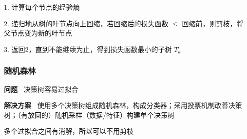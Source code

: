 \documentclass[b4paper, 10pt]{ctexart}
\newcommand*{\setN}{\mathbb{N}}
\newcommand*{\setZ}{\mathbb{Z}}
\newcommand*{\setQ}{\mathbb{Q}}
\newcommand*{\setR}{\mathbb{R}}
\newcommand*{\setC}{\mathbb{C}}
\newcommand*{\powerset}[1]{\mathscr{P}(#1)}
\newcommand*{\impl}{\Rightarrow}
\begin{document}
\begin{multicols}{3}
1. 计算每个节点的经验熵

2. 递归地从树的叶节点向上回缩，若回缩后的损失函数 $\le$ 回缩前，则剪枝，将父节点变为新的叶节点

3. 返回2，直到不能继续为止，得到损失函数最小的子树 $T_a$

\subsubsection{随机森林}
\textbf{问题\ } 决策树容易过拟合

\textbf{解决方案\ } 使用多个决策树组成随机森林，构成分类器；采用投票机制改善决策树；（有放回的）随机采样（数据/特征）构建单个决策树

多个过拟合之间有消解，所以可以不用剪枝
















\end{multicols}
\end{document}
